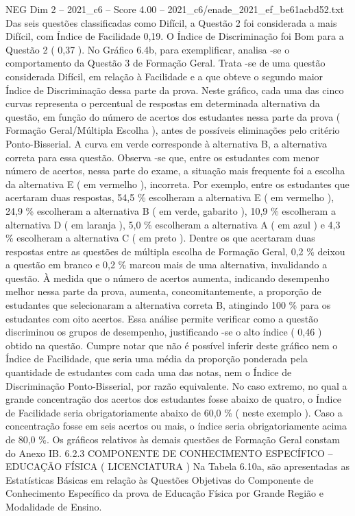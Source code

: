 \begin{textsample}{NEG Dim 2 – 2021\_c6 – Score 4.00 – 2021\_c6/enade\_2021\_ef\_be61acbd52.txt}
Das seis questões classificadas como Difícil, a Questão 2 foi considerada a mais Difícil, com Índice de Facilidade 0,19.
O Índice de Discriminação foi Bom para a Questão 2 ( 0,37 ).
No Gráfico 6.4b, para exemplificar, analisa -se o comportamento da Questão 3 de Formação Geral.
Trata -se de uma questão considerada Difícil, em relação à Facilidade e a que obteve o segundo maior Índice de Discriminação dessa parte da prova.
Neste gráfico, cada uma das cinco curvas representa o percentual de respostas em determinada alternativa da questão, em função do número de acertos dos estudantes nessa parte da prova ( Formação Geral/Múltipla Escolha ), antes de possíveis eliminações pelo critério Ponto-Bisserial.
A curva em verde corresponde à alternativa B, a alternativa correta para essa questão.
Observa -se que, entre os estudantes com menor número de acertos, nessa parte do exame, a situação mais frequente foi a escolha da alternativa E ( em vermelho ), incorreta.
Por exemplo, entre os estudantes que acertaram duas respostas, 54,5 \% escolheram a alternativa E ( em vermelho ), 24,9 \% escolheram a alternativa B ( em verde, gabarito ), 10,9 \% escolheram a alternativa D ( em laranja ), 5,0 \% escolheram a alternativa A ( em azul ) e 4,3 \% escolheram a alternativa C ( em preto ).
Dentre os que acertaram duas respostas entre as questões de múltipla escolha de Formação Geral, 0,2 \% deixou a questão em branco e 0,2 \% marcou mais de uma alternativa, invalidando a questão.
À medida que o número de acertos aumenta, indicando desempenho melhor nessa parte da prova, aumenta, concomitantemente, a proporção de estudantes que selecionaram a alternativa correta B, atingindo 100 \% para os estudantes com oito acertos.
Essa análise permite verificar como a questão discriminou os grupos de desempenho, justificando -se o alto índice ( 0,46 ) obtido na questão.
Cumpre notar que não é possível inferir deste gráfico nem o Índice de Facilidade, que seria uma média da proporção ponderada pela quantidade de estudantes com cada uma das notas, nem o Índice de Discriminação Ponto-Bisserial, por razão equivalente.
No caso extremo, no qual a grande concentração dos acertos dos estudantes fosse abaixo de quatro, o Índice de Facilidade seria obrigatoriamente abaixo de 60,0 \% ( neste exemplo ).
Caso a concentração fosse em seis acertos ou mais, o índice seria obrigatoriamente acima de 80,0 \%.
Os gráficos relativos às demais questões de Formação Geral constam do Anexo IB. 6.2.3 COMPONENTE DE CONHECIMENTO ESPECÍFICO – EDUCAÇÃO FÍSICA ( LICENCIATURA ) Na Tabela 6.10a, são apresentadas as Estatísticas Básicas em relação às Questões Objetivas do Componente de Conhecimento Específico da prova de Educação Física por Grande Região e Modalidade de Ensino.

\end{textsample}
